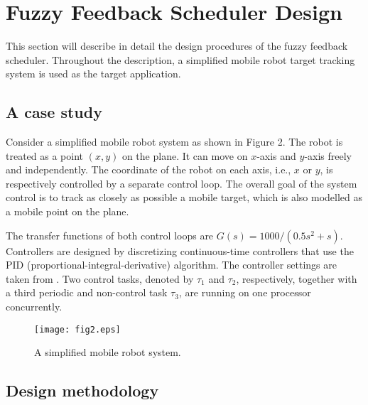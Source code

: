 \documentclass[12pt,a4paper]{ijicic}
\begin{document}
\section{Fuzzy Feedback Scheduler Design}
\label{sec:4}

This section will describe in detail the
design procedures of the fuzzy feedback scheduler. Throughout the
description, a simplified mobile robot target tracking system is
used as the target application.

\subsection{A case study}Consider a simplified mobile robot system \cite{R21}
as shown in Figure 2. The robot is treated as a point $(x, y)$ on
the plane. It can move on $x$-axis and $y$-axis freely and
independently. The coordinate of the robot on each axis, i.e., $x$
or $y$, is respectively controlled by a separate control loop. The
overall goal of the system control is to track as closely as
possible a mobile target, which is also modelled as a mobile point
on the plane.

The transfer functions of both control loops are $G(s) =
1000/(0.5s^2+s)$. Controllers are designed by discretizing
continuous-time controllers that use the PID
(proportional-integral-derivative) algorithm. The controller
settings are taken from \cite{R4}. Two control tasks, denoted by $\tau_1$
and $\tau_2$, respectively, together with a third periodic and
non-control task $\tau_3$, are running on one processor
concurrently.

\begin{figure}[htb!]
\begin{center}
\texttt{[image: fig2.eps]}
\caption{A simplified mobile robot system.}
\label{fig2}
\end{center}
\end{figure}

\subsection{Design methodology}
\end{document}
